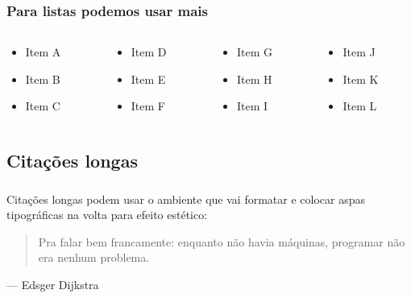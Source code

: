\documentclass[aspectratio=169]{beamer}
\begin{document}
\begin{frame}[t]
  \subsubsection{Para listas podemos usar mais}
  \begin{columns}[T]
    \begin{column}{.25\textwidth}
      \begin{itemize}
        \item Item A
        \item Item B
        \item Item C
      \end{itemize}
    \end{column}
    \begin{column}{.25\textwidth}
      \begin{itemize}
        \item Item D
        \item Item E
        \item Item F
      \end{itemize}
    \end{column}
    \begin{column}{.25\textwidth}
      \begin{itemize}
        \item Item G
        \item Item H
        \item Item I
      \end{itemize}
    \end{column}
    \begin{column}{.25\textwidth}
      \begin{itemize}
        \item Item J
        \item Item K
        \item Item L
      \end{itemize}
    \end{column}
  \end{columns}
\end{frame}

\subsection{Citações longas}
\begin{frame}[t]\frametitle{\secname}\framesubtitle{\subsecname}
  Citações longas podem usar o ambiente  que vai formatar e colocar aspas tipográficas na volta para efeito estético:

  \begin{quotation}
    Pra falar bem francamente: enquanto não havia máquinas, programar não era nenhum problema.
  \end{quotation}
  --- Edsger Dijkstra\raggedleft
\end{frame}
\end{document}

